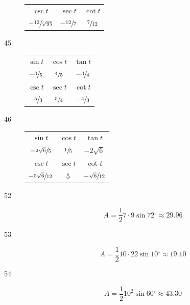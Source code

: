 \documentclass{exam}
\newcommand{\dg}{\ensuremath{^\circ}}
\begin{document}
\begin{description}
\begin{tabular}[H]{ccc}
          $\csc t$                 & $\sec t$         & $\cot t$ \\
          $-\sfrac{12}{\sqrt{95}}$ & $-\sfrac{12}{7}$ & $\sfrac{7}{12}$ \\

          \bottomrule
        \end{tabular}

      \item[45]
        \begin{tabular}[H]{ccc}
          \toprule
          $\sin t$        & $\cos t$       & $\tan t$       \\
          $-\sfrac{3}{5}$ & $\sfrac{4}{5}$ & $-\sfrac{3}{4}$ \\

          \midrule

          $\csc t$        & $\sec t$       & $\cot t$ \\
          $-\sfrac{5}{3}$ & $\sfrac{5}{4}$ & $-\sfrac{4}{3}$ \\

          \bottomrule
        \end{tabular}

      \item[46]
        \begin{tabular}[H]{ccc}
          \toprule

          $\sin t$                  & $\cos t$       & $\tan t$      \\
          $-\sfrac{2 \sqrt{6}}{5}$  & $\sfrac{1}{5}$ & $-2 \sqrt{6}$ \\

          \midrule

          $\csc t$                  & $\sec t$       & $\cot t$ \\
          $-\sfrac{5 \sqrt{6}}{12}$ & $5$            & $-\sfrac{\sqrt{6}}{12}$ \\

          \bottomrule
        \end{tabular}

      \item[52]
        \[
          A = \frac{1}{2} 7 \cdot 9 \sin 72 \dg \approx \boxed{ 29.96 }
        \]

      \item[53]
        \[
          A = \frac{1}{2} 10 \cdot 22 \sin 10 \dg \approx \boxed{ 19.10 }
        \]

      \item[54]
        \[
          A = \frac{1}{2} 10^2 \sin 60 \dg \approx \boxed{ 43.30 }
        \]


\end{description}
\end{document}
